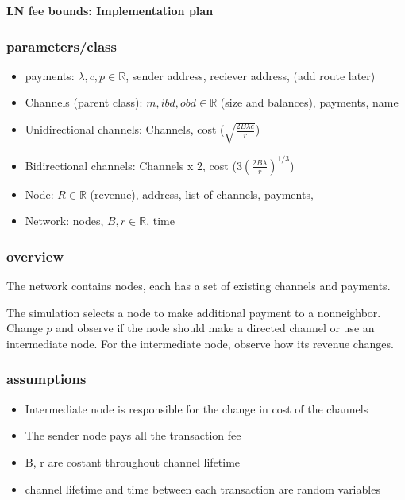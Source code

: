 \documentclass[12pt]{article}
\theoremstyle{plain}
\theoremstyle{remark}
\theoremstyle{definition}
\def\RR{\mathbb{R}}
\def\RR{\mathbb{R}}
\begin{document}
\begin{center}
\begin{Large}
\textbf{LN fee bounds: Implementation plan}

\end{Large}
\end{center}


\subsubsection{parameters/class}
\begin{itemize}
    \item payments: $\lambda, c,p\in \RR$, sender address, reciever address, (add route later)
    \item Channels (parent class): $m, ibd, obd\in \RR$ (size and balances), payments, name
    \item Unidirectional channels: Channels, cost ($\sqrt{\frac{2B\lambda c}{r}}$)
    \item Bidirectional channels: Channels x 2, cost ($3(\frac{2B\lambda}{r})^{1/3}$)
    \item Node: $R\in \RR$ (revenue), address, list of channels, payments, 
    \item Network: nodes, $B, r\in \RR$, time
\end{itemize}


\subsubsection{overview}
The network contains nodes, each has a set of existing channels and payments. 

The simulation selects a node to make additional payment to a nonneighbor. Change $p$ and observe if the node should make a directed channel or use an intermediate node. For the intermediate node, observe how its revenue changes. 

\subsubsection{assumptions}
\begin{itemize}
    \item Intermediate node is responsible for the change in cost of the channels 
    \item The sender node pays all the transaction fee
    \item B, r are costant throughout channel lifetime
    \item channel lifetime and time between each transaction are random variables
\end{itemize}
\end{document}
